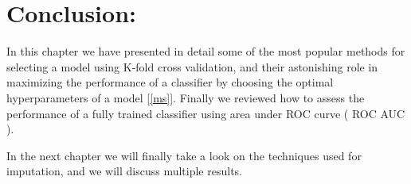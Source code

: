 \section{Conclusion:}

In this chapter we have presented in detail some of the most popular  methods for selecting  a model using K-fold cross validation, and their astonishing role in maximizing the performance of a classifier by choosing the optimal hyperparameters of a model [\ref{ms}].
Finally we reviewed  how to  assess the performance of a fully trained classifier using area under ROC curve ( ROC AUC ).

In the next chapter we will finally take a look on the techniques used for imputation, and we will discuss multiple results.
